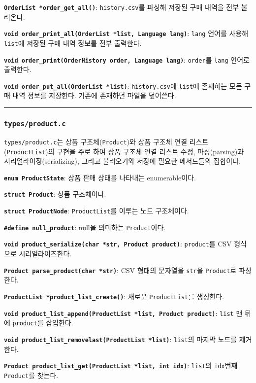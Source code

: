 \documentclass[runningheads]{llncs}
\begin{document}
\textbf{\texttt{OrderList *order_get_all()}}: \texttt{history.csv}를 파싱해 저장된 구매 내역을 전부 불러온다.

\textbf{\texttt{void order_print_all(OrderList *list, Language lang)}}: \texttt{lang} 언어를 사용해 \texttt{list}에 저장된 구매 내역 정보를 전부 출력한다.

\textbf{\texttt{void order_print(OrderHistory order, Language lang)}}: \texttt{order}를 \texttt{lang} 언어로 출력한다.

\textbf{\texttt{void order_put_all(OrderList *list)}}: \texttt{history.csv}에 \texttt{list}에 존재하는 모든 구매 내역 정보를 저장한다. 기존에 존재하던 파일을 덮어쓴다.

\noindent\rule{2cm}{0.4pt}

\subsubsection{\texttt{types/product.c}}
\texttt{types/product.c}는 상품 구조체(\texttt{Product})와 상품 구조체 연결 리스트(\texttt{ProductList})의 구현을 주로 하여 상품 구조체 연결 리스트 수정, 파싱(parsing)과 시리얼라이징(serializing), 그리고 불러오기와 저장에 필요한 메서드들의 집합이다.

\textbf{\texttt{enum ProductState}}: 상품 판매 상태를 나타내는 enumerable이다.

\textbf{\texttt{struct Product}}: 상품 구조체이다.

\textbf{\texttt{struct ProductNode}}: \texttt{ProductList}를 이루는 노드 구조체이다.

\textbf{\texttt{\#define null_product}}: null을 의미하는 \texttt{Product}이다.

\textbf{\texttt{void product_serialize(char *str, Product product)}}: \texttt{product}를 CSV 형식으로 시리얼라이즈한다.

\textbf{\texttt{Product parse_product(char *str)}}: CSV 형태의 문자열을 \texttt{str}을 \texttt{Product}로 파싱한다.

\textbf{\texttt{ProductList *product_list_create()}}: 새로운 \texttt{ProductList}를 생성한다.

\textbf{\texttt{void product_list_append(ProductList *list, Product product)}}: \texttt{list} 맨 뒤에 \texttt{product}를 삽입한다.

\textbf{\texttt{void product_list_removelast(ProductList *list)}}: \texttt{list}의 마지막 노드를 제거한다.

\textbf{\texttt{Product product_list_get(ProductList *list, int idx)}}: \texttt{list}의 \texttt{idx}번째 \texttt{Product}를 찾는다.
\end{document}
